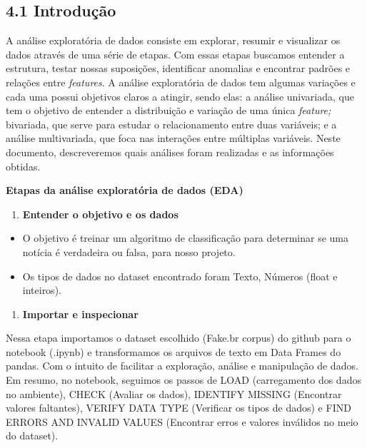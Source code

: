 \documentclass[
  brazilian,
  11pt,
]{article}
\providecommand{\tightlist}{%
  \setlength{\itemsep}{0pt}\setlength{\parskip}{0pt}}
\begin{document}
\subsection{4.1 Introdução}\label{introduuxe7uxe3o}

A análise exploratória de dados consiste em explorar, resumir e visualizar os dados através de uma série de etapas. Com essas etapas buscamos entender a estrutura, testar nossas suposições, identificar anomalias e encontrar padrões e relações entre \emph{features}. A análise exploratória de dados tem algumas variações e cada uma possui objetivos claros a atingir, sendo elas: a análise univariada, que tem o objetivo de entender a distribuição e variação de uma única \emph{feature;} bivariada, que serve para estudar o relacionamento entre duas variáveis; e a análise multivariada, que foca nas interações entre múltiplas variáveis. Neste documento, descreveremos quais análises foram realizadas e as informações obtidas.

\textbf{Etapas da análise exploratória de dados (EDA)}

\begin{enumerate}
\def\labelenumi{\arabic{enumi}.}
\tightlist
\item
  \textbf{Entender o objetivo e os dados}
\end{enumerate}

\begin{itemize}
\tightlist
\item
  O objetivo é treinar um algoritmo de classificação para determinar se uma notícia é verdadeira ou falsa, para nosso projeto.
\item
  Os tipos de dados no dataset encontrado foram Texto, Números (float e inteiros).
\end{itemize}

\begin{enumerate}
\def\labelenumi{\arabic{enumi}.}
\tightlist
\setcounter{enumi}{1}
\item
  \textbf{Importar e inspecionar}
\end{enumerate}

Nessa etapa importamos o dataset escolhido (Fake.br corpus) do github para o notebook (.ipynb) e transformamos os arquivos de texto em Data Frames do pandas. Com o intuito de facilitar a exploração, análise e manipulação de dados. Em resumo, no notebook, seguimos os passos de LOAD (carregamento dos dados no ambiente), CHECK (Avaliar os dados), IDENTIFY MISSING (Encontrar valores faltantes), VERIFY DATA TYPE (Verificar os tipos de dados) e FIND ERRORS AND INVALID VALUES (Encontrar erros e valores inválidos no meio do dataset).
\end{document}
